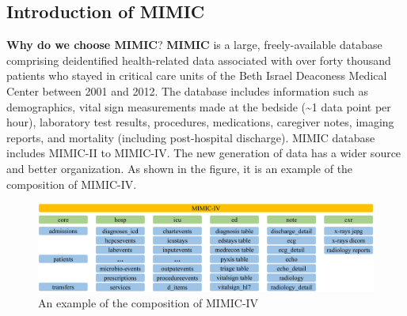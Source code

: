 

\subsection{Introduction of MIMIC}
\textbf {Why do we choose MIMIC}? \textbf{MIMIC} is a large, freely-available database comprising deidentified health-related data associated with over forty thousand patients who stayed in critical care units of the Beth Israel Deaconess Medical Center between 2001 and 2012. The database includes information such as demographics, vital sign measurements made at the bedside (\textasciitilde 1 data point per hour), laboratory test results, procedures, medications, caregiver notes, imaging reports, and mortality (including post-hospital discharge). MIMIC database includes MIMIC-II to MIMIC-IV. The new generation of data has a wider source and better organization. As shown in the  figure, it is an example of the composition of MIMIC-IV.

\begin{figure}[ht]
    \centering
    \includegraphics[width=1\linewidth]{images/MIMIC_composition.png}
    \caption{An example of the composition of MIMIC-IV}
    \label{fig:MIMIC_composition}
\end{figure}

